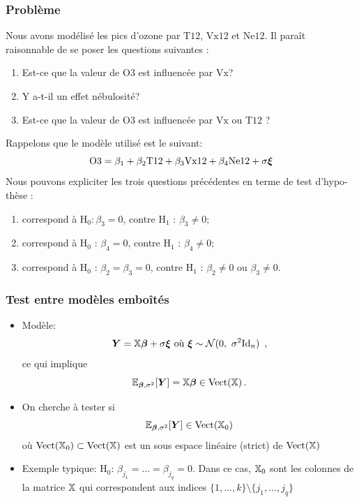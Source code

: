 \begin{frame}
\frametitle{Problème}
Nous avons modélisé les pics d'ozone par $\mathrm{T12}$, $\mathrm{Vx12}$ et $\mathrm{Ne12}$.
Il para\^{i}t raisonnable de se poser les questions suivantes :
\begin{enumerate}
\item Est-ce que la valeur de $\mathrm{O3}$ est influenc\'{e}e par $\mathrm{Vx}$?
\item Y a-t-il un effet n\'{e}bulosit\'{e}?
\item Est-ce que la valeur de $\mathrm{O3}$ est influenc\'{e}e par $\mathrm{Vx}$ ou $\mathrm{T12}$ ?
\end{enumerate}
Rappelons que le mod\`{e}le utilis\'{e} est le suivant:
\[
\mathrm{O3}= \beta_1 + \beta_2 \mathrm{T12} + \beta_3 \mathrm{Vx12} + \beta_4 \mathrm{Ne12} + \sigma \boldsymbol{\xi}
\]
Nous pouvons expliciter les trois questions pr\'{e}c\'{e}dentes en terme de test d'hypo- th\`{e}se :
\begin{enumerate}
\item correspond \`{a} $\mathrm{H}_{0}:\beta_{3}=0$, contre $\mathrm{H}_{1}$ : $\beta_{3}\neq 0$;
\item  correspond \`{a} $\mathrm{H}_{0}$ : $\beta_{4}=0$, contre $\mathrm{H}_{1}$ : $\beta_{4}\neq 0$;
\item correspond \`{a} $\mathrm{H}_{0}$ : $\beta_{2}=\beta_{3}=0$, contre $\mathrm{H}_{1}$ : $\beta_{2}\neq 0$ ou $\beta_{3}\neq 0$.
\end{enumerate}
\end{frame}

\begin{frame}
\frametitle{Test entre mod\`{e}les embo\^{i}t\'{e}s}
\begin{itemize}
\item \alert{Modèle}:
$$
\text{
$\operatorname{\boldsymbol{Y}}=\mathbb{X}\boldsymbol{\beta}+ \sigma \boldsymbol{\xi}$ o\`{u} $\boldsymbol{\xi} \sim \mathcal{N}(0,\ \sigma^{2}\mathrm{Id}_{n})$ \,,
}
$$
ce qui implique
$$ \operatorname{{\mathbb E}}_{\boldsymbol{\beta},\sigma^2}[\operatorname{\boldsymbol{Y}}]= \mathbb{X} \boldsymbol{\beta} \in \mathrm{Vect}(\mathbb{X}) \,.
$$
\item On cherche à tester si 
$$\operatorname{{\mathbb E}}_{\boldsymbol{\beta},\sigma^2}[\operatorname{\boldsymbol{Y}}] \in \mathrm{Vect}(\mathbb{X}_0)
$$ 
où $\mathrm{Vect}(\mathbb{X}_0) \subset \mathrm{Vect}(\mathbb{X})$ est un sous espace linéaire (strict) de $\mathrm{Vect}(\mathbb{X})$
\item \alert{Exemple typique:} $\mathrm{H}_0$: $\beta_{j_1} = \dots = \beta_{j_q}= 0$. Dans ce cas, $\mathbb{X}_0$ sont les colonnes
de la matrice $\mathbb{X}$ qui correspondent aux indices $\{1,\dots,k\} \setminus \{j_1,\dots,j_q\}$
\end{itemize}
\end{frame}



